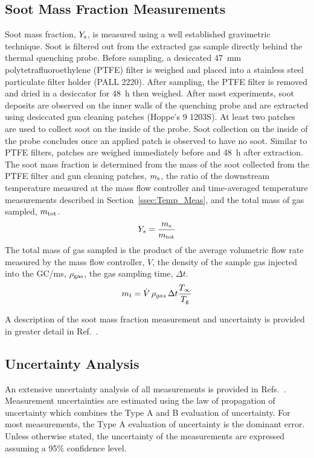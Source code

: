 \documentclass[12pt]{ussci}
\begin{document}
\subsection{Soot Mass Fraction Measurements}
Soot mass fraction, $Y_{\rm s}$, is measured using a well established gravimetric technique. Soot is filtered out from the extracted gas sample directly behind the thermal quenching probe. Before sampling, a desiccated 47~mm polytetrafluoroethylene (PTFE) filter is weighed and placed into a stainless steel particulate filter holder (PALL 2220). After sampling, the PTFE filter is removed and dried in a desiccator for 48~h then weighed. 
After most experiments, soot deposits are observed on the inner walls of the quenching probe and are extracted using desiccated gun cleaning patches (Hoppe's 9 1203S). At least two patches are used to collect soot on the inside of the probe. Soot collection on the inside of the probe concludes once an applied patch is observed to have no soot. Similar to PTFE filters, patches are weighed immediately before and 48~h after extraction. 
The soot mass fraction is determined from the mass of the soot collected from the PTFE filter and gun cleaning patches, $m_{\rm s}$, the ratio of the downstream temperature measured at the mass flow controller and time-averaged temperature measurements described in Section~\ref{ssec:Temp_Meas}, and the total mass of gas sampled, $m_{\rm tot}$.
\begin{equation}\label{eq:soot_mass_frac}
Y_{s}= \frac{m_{\rm s}}{m_{\rm tot}}
\end{equation}
The total mass of gas sampled is the product of the average volumetric flow rate measured by the mass flow controller, $\dot{V}$, the density of the sample gas injected into the GC/ms, $\rho_{\rm gas}$, the gas sampling time, $\Delta t$. 
\begin{equation}\label{eq:total_mass}
m_{t}= \dot{V} \, \rho_{gas}\, \Delta t \frac{T_{\infty}}{T_{\rm g}}
\end{equation}

A description of the soot mass fraction measurement and uncertainty is provided in greater detail in Ref.~\cite{ Falkenstein2021a}. 

\subsection{Uncertainty Analysis}
An extensive uncertainty analysis of all measurements is provided in Refs.~\cite{Sung2020,Sung2021, Falkenstein2021a}. Measurement uncertainties are estimated using the law of propagation of uncertainty which combines the Type A and B evaluation of uncertainty. For most measurements, the Type A evaluation of uncertainty is the dominant error. Unless otherwise stated, the uncertainty of the measurements are expressed assuming a 95\% confidence level. 
\end{document}
